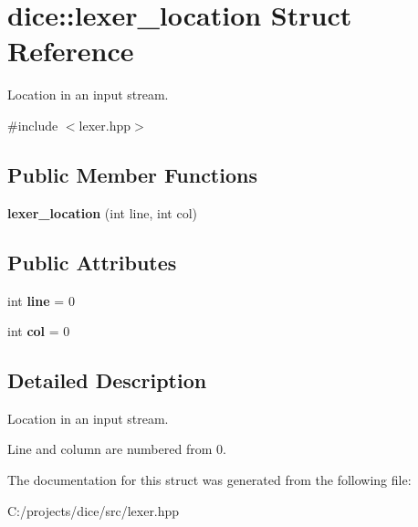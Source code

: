 \hypertarget{structdice_1_1lexer__location}{}\section{dice\+:\+:lexer\+\_\+location Struct Reference}
\label{structdice_1_1lexer__location}


Location in an input stream.  




{\ttfamily \#include $<$lexer.\+hpp$>$}

\subsection*{Public Member Functions}
\begin{DoxyCompactItemize}
\item 
\mbox{\label{structdice_1_1lexer__location_aa77b6af01f59fe8aecbd3e23e930dbf9}} 
{\bfseries lexer\+\_\+location} (int line, int col)
\end{DoxyCompactItemize}
\subsection*{Public Attributes}
\begin{DoxyCompactItemize}
\item 
\mbox{\label{structdice_1_1lexer__location_abdc889c92dc1661c08aa9790e6f64e2c}} 
int {\bfseries line} = 0
\item 
\mbox{\label{structdice_1_1lexer__location_a978d43983b9ef3601bc7217f980650b3}} 
int {\bfseries col} = 0
\end{DoxyCompactItemize}


\subsection{Detailed Description}
Location in an input stream. 

Line and column are numbered from 0. 

The documentation for this struct was generated from the following file\+:\begin{DoxyCompactItemize}
\item 
C\+:/projects/dice/src/lexer.\+hpp\end{DoxyCompactItemize}
